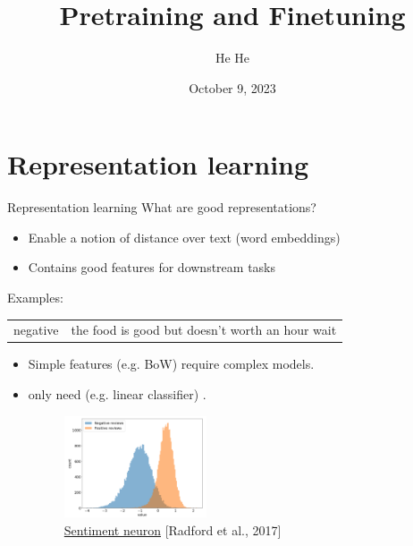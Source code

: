 \documentclass[usenames,dvipsnames,notes,11pt,aspectratio=169,hyperref={colorlinks=true, linkcolor=blue}]{beamer}
\title[DS-GA.1011]{Pretraining and Finetuning}
\author[He He]{He He
}
\institute[NYU]{
    \texttt{[image: ../figures/nyu-logo]}\\
}
\date{October 9, 2023}
\begin{document}
\begin{frame}
\titlepage
\end{frame}

\section{Representation learning}

\begin{frame}
    {Representation learning}
    What are good representations?\\
    \begin{itemize}
        \item Enable a notion of distance over text (word embeddings)
        \item Contains good features for downstream tasks 
    \end{itemize}

    \pause
    Examples:
        \begin{tabular}{ll}
            negative & the food is good but doesn't worth an hour wait
        \end{tabular}

    \begin{itemize}
        \item Simple features (e.g. BoW) require complex models.\\
        \item {} only need  (e.g. linear classifier) .
    \vspace{-1em}
    \begin{figure}
        \includegraphics[height=3cm]{figures/sentiment}
        \caption{\href{https://arxiv.org/abs/1704.01444}{Sentiment neuron} [Radford et al., 2017]}
    \end{figure}
    \end{itemize}
\end{frame}
\end{document}
